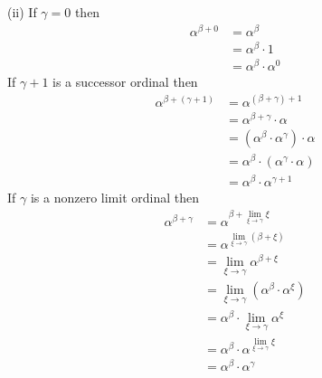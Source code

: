\begin{solution}
(ii) If $\gamma = 0$ then
\begin{align*}
\alpha^{\beta + 0} &= \alpha^{\beta} \\
&= \alpha^{\beta} \cdot 1 \\
&= \alpha^{\beta} \cdot \alpha^0
\end{align*}
If $\gamma + 1$ is a successor ordinal then
\begin{align*}
\alpha^{\beta + \left( \gamma + 1 \right)} &= \alpha^{\left( \beta + \gamma 
  \right) + 1} \\
&= \alpha^{\beta + \gamma} \cdot \alpha \\
&= ( \alpha^{\beta} \cdot \alpha^{\gamma} ) \cdot \alpha \\
&= \alpha^{\beta} \cdot \left (\alpha^{\gamma} \cdot \alpha \right) \\
&= \alpha^{\beta} \cdot \alpha^{\gamma + 1}
\end{align*}
If $\gamma$ is a nonzero limit ordinal then
\begin{align*}
\alpha^{\beta + \gamma} &= \alpha^{\beta + \lim_{\xi \rightarrow \gamma} \xi} 
  \\
&= \alpha^{\lim_{\xi \rightarrow \gamma} \left( \beta + \xi \right)} \\
&= \lim_{\xi \rightarrow \gamma} \alpha^{\beta + \xi} \\
&= \lim_{\xi \rightarrow \gamma} \left( \alpha^{\beta} \cdot \alpha^{\xi} 
  \right) \\
&= \alpha^{\beta} \cdot \lim_{\xi \rightarrow \gamma} \alpha^{\xi} \\
&= \alpha^{\beta} \cdot \alpha^{\lim_{\xi \rightarrow \gamma} \xi} \\
&= \alpha^{\beta} \cdot \alpha^{\gamma}
\end{align*}


\end{solution}
